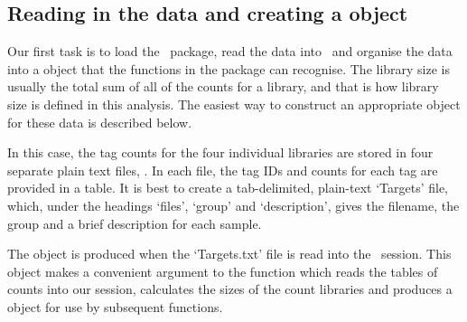 \subsection{Reading in the data and creating a  object}
Our first task is to load the \edgeR~package, read the data into
\R~and organise the data into a  object that the
functions in the package can recognise. The library size is usually
the total sum of all of the counts for a library, and that is how
library size is defined in this analysis. The easiest way to construct
an appropriate  object for these data is described
below.

In this case, the tag counts for the four individual libraries are
stored in four separate plain text files, . In each file, the
tag IDs and counts for each tag are provided in a table. It is best to
create a tab-delimited, plain-text `Targets' file, which, under the
headings `files', `group' and `description', gives the filename, the
group and a brief description for each sample.

The  object is produced when the `Targets.txt' file is
read into the \R~session. This object makes a convenient argument to
the function  which reads the tables of counts into our
 session, calculates the sizes of the count libraries and
produces a  object for use by subsequent functions.

